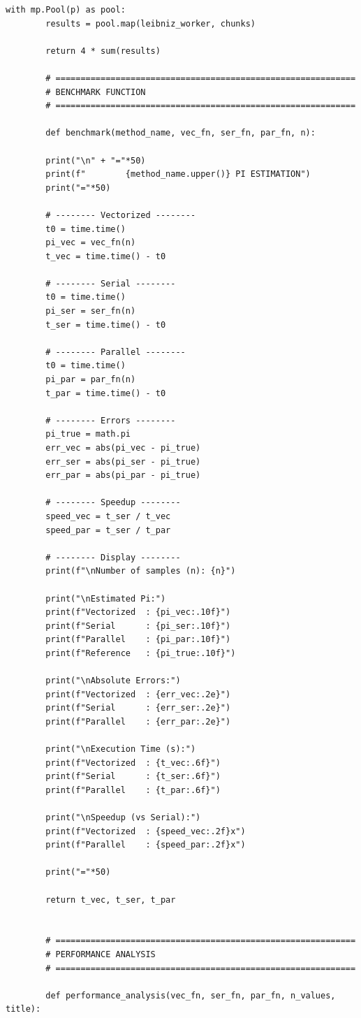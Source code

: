 \documentclass[12pt, a4paper]{article}
\begin{document}
\begin{lstlisting}[style=python, caption={pratica01e02.py}, label={lst:python_mc}]
		with mp.Pool(p) as pool:
		results = pool.map(leibniz_worker, chunks)
		
		return 4 * sum(results)
		
		# ============================================================
		# BENCHMARK FUNCTION
		# ============================================================
		
		def benchmark(method_name, vec_fn, ser_fn, par_fn, n):
		
		print("\n" + "="*50)
		print(f"        {method_name.upper()} PI ESTIMATION")
		print("="*50)
		
		# -------- Vectorized --------
		t0 = time.time()
		pi_vec = vec_fn(n)
		t_vec = time.time() - t0
		
		# -------- Serial --------
		t0 = time.time()
		pi_ser = ser_fn(n)
		t_ser = time.time() - t0
		
		# -------- Parallel --------
		t0 = time.time()
		pi_par = par_fn(n)
		t_par = time.time() - t0
		
		# -------- Errors --------
		pi_true = math.pi
		err_vec = abs(pi_vec - pi_true)
		err_ser = abs(pi_ser - pi_true)
		err_par = abs(pi_par - pi_true)
		
		# -------- Speedup --------
		speed_vec = t_ser / t_vec
		speed_par = t_ser / t_par
		
		# -------- Display --------
		print(f"\nNumber of samples (n): {n}")
		
		print("\nEstimated Pi:")
		print(f"Vectorized  : {pi_vec:.10f}")
		print(f"Serial      : {pi_ser:.10f}")
		print(f"Parallel    : {pi_par:.10f}")
		print(f"Reference   : {pi_true:.10f}")
		
		print("\nAbsolute Errors:")
		print(f"Vectorized  : {err_vec:.2e}")
		print(f"Serial      : {err_ser:.2e}")
		print(f"Parallel    : {err_par:.2e}")
		
		print("\nExecution Time (s):")
		print(f"Vectorized  : {t_vec:.6f}")
		print(f"Serial      : {t_ser:.6f}")
		print(f"Parallel    : {t_par:.6f}")
		
		print("\nSpeedup (vs Serial):")
		print(f"Vectorized  : {speed_vec:.2f}x")
		print(f"Parallel    : {speed_par:.2f}x")
		
		print("="*50)
		
		return t_vec, t_ser, t_par
		
		
		# ============================================================
		# PERFORMANCE ANALYSIS
		# ============================================================
		
		def performance_analysis(vec_fn, ser_fn, par_fn, n_values, title):
		

\end{lstlisting}
\end{document}
